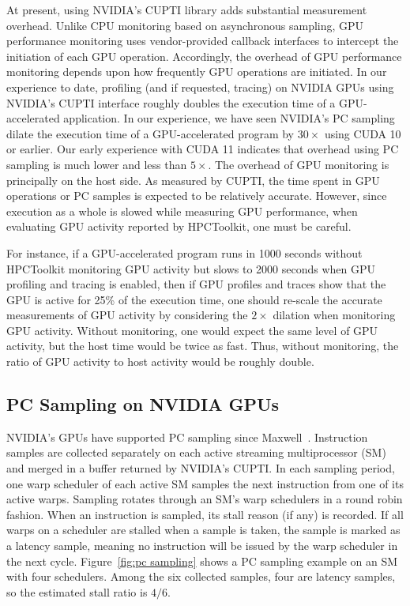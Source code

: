 At present, using NVIDIA's CUPTI library adds substantial measurement overhead.  Unlike CPU monitoring based on asynchronous sampling, GPU performance monitoring uses vendor-provided callback interfaces to intercept the initiation of each GPU operation. Accordingly,  the overhead of GPU performance monitoring depends upon how frequently GPU operations are initiated. 
In our experience to date, profiling (and if requested, tracing) on NVIDIA GPUs using NVIDIA's CUPTI interface roughly doubles the execution time of a GPU-accelerated application. In our experience, we have seen NVIDIA's PC sampling dilate the execution time of a GPU-accelerated program by $30\times$ using CUDA 10 or earlier.  Our early experience with CUDA 11 indicates that overhead using PC sampling is much lower and less than $5\times$. The overhead of GPU monitoring is principally on the host side. As measured by CUPTI, the time spent in GPU operations or PC samples is expected to be relatively accurate. However, since execution as a whole is slowed while measuring GPU performance, when evaluating GPU activity reported by HPCToolkit, one must be careful.

For instance, if a GPU-accelerated program runs in 1000 seconds without HPCToolkit monitoring GPU activity but slows to 2000 seconds when GPU profiling and tracing is enabled, then if GPU profiles and traces show that the GPU is active for 25\% of the execution time, one should  re-scale the accurate measurements of GPU activity by considering the $2\times$ dilation when monitoring GPU activity. Without monitoring, one would expect the same level of GPU activity, but the host time would be twice as fast. Thus, without monitoring, the ratio of GPU activity to host activity would be roughly double.
 

\subsection{PC Sampling on NVIDIA GPUs}
\label{nvidia-pc-sampling} 

NVIDIA's GPUs have supported PC sampling since Maxwell~\cite{cuptipcsampling}.
Instruction samples are collected separately on each active streaming
multiprocessor (SM) and merged in a buffer returned by NVIDIA's CUPTI. 
In each sampling period, one warp scheduler of each active SM 
samples the next instruction from one of its active warps. Sampling rotates through
an SM's warp schedulers in a round robin fashion.
When an instruction is sampled, its stall reason (if any) is
recorded. If all warps on a scheduler are stalled when a sample is
taken, the sample is marked as a latency sample, meaning no instruction will be issued by the warp scheduler in the next cycle.
Figure~\ref{fig:pc sampling} shows a PC sampling example on an SM with four schedulers. Among the six collected samples, four are latency samples, so the estimated stall ratio is $4/6$. 

